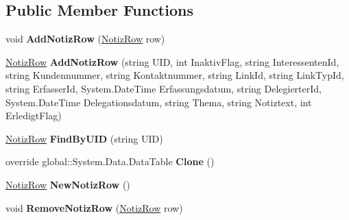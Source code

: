 \subsection*{Public Member Functions}
\begin{DoxyCompactItemize}
\item 
void {\bfseries Add\+Notiz\+Row} (\hyperlink{class_products_1_1_data_1_1ds_sage_1_1_notiz_row}{Notiz\+Row} row)\hypertarget{class_products_1_1_data_1_1ds_sage_1_1_notiz_data_table_a3e8468c3b35191b03b5b24d56a661b6e}{}\label{class_products_1_1_data_1_1ds_sage_1_1_notiz_data_table_a3e8468c3b35191b03b5b24d56a661b6e}

\item 
\hyperlink{class_products_1_1_data_1_1ds_sage_1_1_notiz_row}{Notiz\+Row} {\bfseries Add\+Notiz\+Row} (string U\+ID, int Inaktiv\+Flag, string Interessenten\+Id, string Kundennummer, string Kontaktnummer, string Link\+Id, string Link\+Typ\+Id, string Erfasser\+Id, System.\+Date\+Time Erfassungsdatum, string Delegierter\+Id, System.\+Date\+Time Delegationsdatum, string Thema, string Notiztext, int Erledigt\+Flag)\hypertarget{class_products_1_1_data_1_1ds_sage_1_1_notiz_data_table_a9f06dd4deb9c15a249e26b1f8e7f80ee}{}\label{class_products_1_1_data_1_1ds_sage_1_1_notiz_data_table_a9f06dd4deb9c15a249e26b1f8e7f80ee}

\item 
\hyperlink{class_products_1_1_data_1_1ds_sage_1_1_notiz_row}{Notiz\+Row} {\bfseries Find\+By\+U\+ID} (string U\+ID)\hypertarget{class_products_1_1_data_1_1ds_sage_1_1_notiz_data_table_afb54b6f8f9187bd702bee41100fa3e1e}{}\label{class_products_1_1_data_1_1ds_sage_1_1_notiz_data_table_afb54b6f8f9187bd702bee41100fa3e1e}

\item 
override global\+::\+System.\+Data.\+Data\+Table {\bfseries Clone} ()\hypertarget{class_products_1_1_data_1_1ds_sage_1_1_notiz_data_table_a3edcfa9046447269ecc3435f96384257}{}\label{class_products_1_1_data_1_1ds_sage_1_1_notiz_data_table_a3edcfa9046447269ecc3435f96384257}

\item 
\hyperlink{class_products_1_1_data_1_1ds_sage_1_1_notiz_row}{Notiz\+Row} {\bfseries New\+Notiz\+Row} ()\hypertarget{class_products_1_1_data_1_1ds_sage_1_1_notiz_data_table_af35c005a000aaec5de830918064689b9}{}\label{class_products_1_1_data_1_1ds_sage_1_1_notiz_data_table_af35c005a000aaec5de830918064689b9}

\item 
void {\bfseries Remove\+Notiz\+Row} (\hyperlink{class_products_1_1_data_1_1ds_sage_1_1_notiz_row}{Notiz\+Row} row)\hypertarget{class_products_1_1_data_1_1ds_sage_1_1_notiz_data_table_a30d359d80858e78a9bf6716ec42f6085}{}\label{class_products_1_1_data_1_1ds_sage_1_1_notiz_data_table_a30d359d80858e78a9bf6716ec42f6085}

\end{DoxyCompactItemize}
